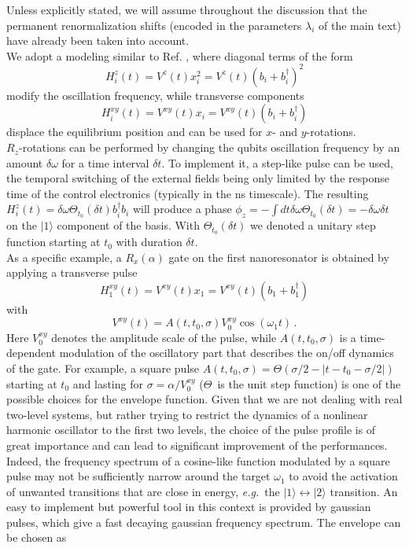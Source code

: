 \documentclass[aps,twocolumn,groupedaddress,superscriptaddress,floatfix,amsmath,amssymb,prb]{revtex4-1}
\begin{document}
Unless explicitly stated, we will assume throughout the discussion that the permanent renormalization shifts (encoded in the parameters $\lambda_i$ of the main text) have already been taken into account.\\
{We adopt a modeling similar to Ref. , where diagonal terms of the form
\begin{equation}
H^z_i(t) = V^z (t) x_i^2 = V^z (t) (b_i + b_i^\dagger)^2
\end{equation} 
modify the oscillation frequency, while transverse components
\begin{equation}
H^{xy}_i(t) = V^{xy} (t) x_i = V^{xy} (t) (b_i + b_i^\dagger)
\end{equation}
displace the equilibrium position and can be used for $x$- and $y$-rotations. \\
$R_z$-rotations can be performed by changing the qubits oscillation frequency by an amount $\delta\omega$ for a time interval $\delta t$. 
To implement it, a step-like pulse can be used, the temporal switching of the external fields being only limited by the response time of the control electronics (typically in the ns timescale). The resulting $H_i^z(t) = \delta\omega \Theta_{t_0}(\delta t) b_i^\dagger b_i$ will produce a phase $\phi_z = -\int dt \delta\omega \Theta_{t_0}(\delta t) = - \delta\omega \delta t$ on the $|1\rangle$ component of the basis. With $\Theta_{t_0} (\delta t)$ we denoted a unitary step function starting at $t_0$ with duration $\delta t$. }\\
As a specific example, a $R_x(\alpha)$ gate on the first nanoresonator is obtained by applying a transverse pulse
\begin{equation}
H^{xy}_1(t) = V^{xy} (t) x_1 = V^{xy} (t) (b_1 + b_1^\dagger)
\end{equation}
with
\begin{equation}
V^{xy} (t) = A(t,t_0,\sigma)V^{xy}_0 \cos (\omega_1 t) \, .
\end{equation}
Here $V^{xy}_0$ denotes the amplitude scale of the pulse, while $A(t,t_0,\sigma)$ is a time-dependent modulation of the oscillatory part that describes the on/off dynamics of the gate. For example, a square pulse $A(t,t_0,\sigma) = \Theta(\sigma/2-|t-t_0-\sigma/2|)$ starting at $t_0$ and lasting for $\sigma = \alpha/V^{xy}_0$ ($\Theta$~is the unit step function) is one of the possible choices for the envelope function. Given that we are not dealing with real two-level systems, but rather trying to restrict the dynamics of a nonlinear harmonic oscillator to the first two levels, the choice of the pulse profile is of great importance and can lead to significant improvement of the performances. Indeed, the frequency spectrum of a cosine-like function modulated by a square pulse may not be sufficiently narrow around the target $\omega_1$ to avoid the activation of unwanted transitions that are close in energy, \textit{e.g.}\ the $|1\rangle \leftrightarrow |2\rangle$ transition. An easy to implement but powerful tool in this context is provided by gaussian pulses, which give a fast decaying gaussian frequency spectrum. The envelope can be chosen as
\end{document}

